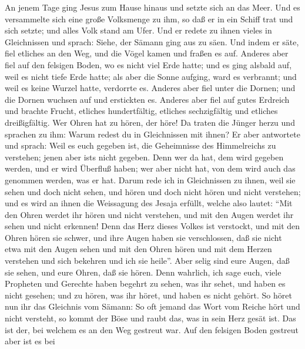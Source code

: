  An jenem Tage ging Jesus zum Hause hinaus und setzte sich
an das Meer.  Und es versammelte sich eine große
Volksmenge zu ihm, so daß er in ein Schiff trat und sich setzte; und
alles Volk stand am Ufer.  Und er redete zu ihnen vieles
in Gleichnissen und sprach: Siehe, der Sämann ging aus zu säen.
 Und indem er säte, fiel etliches an den Weg, und die
Vögel kamen und fraßen es auf.  Anderes aber fiel auf den
felsigen Boden, wo es nicht viel Erde hatte; und es ging alsbald auf,
weil es nicht tiefe Erde hatte;  als aber die Sonne
aufging, ward es verbrannt; und weil es keine Wurzel hatte, verdorrte
es.  Anderes aber fiel unter die Dornen; und die Dornen
wuchsen auf und erstickten es.  Anderes aber fiel auf
gutes Erdreich und brachte Frucht, etliches hundertfältig, etliches
sechzigfältig und etliches dreißigfältig.  Wer Ohren hat
zu hören, der höre!  Da traten die Jünger herzu und
sprachen zu ihm: Warum redest du in Gleichnissen mit ihnen?
 Er aber antwortete und sprach: Weil es euch gegeben ist,
die Geheimnisse des Himmelreichs zu verstehen; jenen aber
ist\textquotesingle s nicht gegeben.  Denn wer da hat,
dem wird gegeben werden, und er wird Überfluß haben; wer aber nicht hat,
von dem wird auch das genommen werden, was er hat.  Darum
rede ich in Gleichnissen zu ihnen, weil sie sehen und doch nicht sehen,
und hören und doch nicht hören und nicht verstehen;  und
es wird an ihnen die Weissagung des Jesaja erfüllt, welche also lautet:
``Mit den Ohren werdet ihr hören und nicht verstehen, und mit den Augen
werdet ihr sehen und nicht erkennen!  Denn das Herz
dieses Volkes ist verstockt, und mit den Ohren hören sie schwer, und
ihre Augen haben sie verschlossen, daß sie nicht etwa mit den Augen
sehen und mit den Ohren hören und mit dem Herzen verstehen und sich
bekehren und ich sie heile''.  Aber selig sind eure
Augen, daß sie sehen, und eure Ohren, daß sie hören. 
Denn wahrlich, ich sage euch, viele Propheten und Gerechte haben begehrt
zu sehen, was ihr sehet, und haben es nicht gesehen; und zu hören, was
ihr höret, und haben es nicht gehört.  So höret nun ihr
das Gleichnis vom Sämann:  So oft jemand das Wort vom
Reiche hört und nicht versteht, so kommt der Böse und raubt das, was in
sein Herz gesät ist. Das ist der, bei welchem es an den Weg gestreut
war.  Auf den felsigen Boden gestreut aber ist es bei

